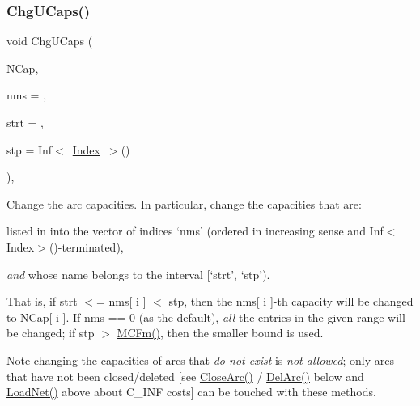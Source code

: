 \subsubsection{\texorpdfstring{Chg\+U\+Caps()}{ChgUCaps()}}
{\footnotesize\ttfamily void Chg\+U\+Caps (\begin{DoxyParamCaption}\item[{\mbox{\hyperlink{class_m_c_f_class_ad325f3193dbba0ddef1da4e72d29eda6}{c\+F\+Row}}}]{N\+Cap,  }\item[{\mbox{\hyperlink{class_m_c_f_class_a81575b2d4e4d5636b17170432150ae69}{c\+Index\+\_\+\+Set}}}]{nms = {},  }\item[{\mbox{\hyperlink{class_m_c_f_class_a76aaabb20535c51a2752b93f6c38fe54}{c\+Index}}}]{strt = {},  }\item[{\mbox{\hyperlink{class_m_c_f_class_ad53d6229d7ec28555a9c9c2fd9abf773}{Index}}}]{stp = {\ttfamily Inf$<$~\mbox{\hyperlink{class_m_c_f_class_ad53d6229d7ec28555a9c9c2fd9abf773}{Index}}~$>$()} }\end{DoxyParamCaption})\hspace{0.3cm}{\ttfamily [override]}, {\ttfamily [virtual]}}

Change the arc capacities. In particular, change the capacities that are\+:


\begin{DoxyItemize}
\item listed in into the vector of indices `nms' (ordered in increasing sense and Inf$<$\+Index$>$()-\/terminated),
\item {\itshape and} whose name belongs to the interval \mbox{[}`strt', `stp').
\end{DoxyItemize}

That is, if strt $<$= nms\mbox{[} i \mbox{]} $<$ stp, then the nms\mbox{[} i \mbox{]}-\/th capacity will be changed to N\+Cap\mbox{[} i \mbox{]}. If nms == 0 (as the default), {\itshape all} the entries in the given range will be changed; if stp $>$ \mbox{\hyperlink{class_m_c_f_class_ab4d5a0d0fc49882de0b4eb3146f1b7a6}{M\+C\+Fm()}}, then the smaller bound is used.

\begin{DoxyNote}{Note}
changing the capacities of arcs that {\itshape do not exist} is {\itshape not allowed}; only arcs that have not been closed/deleted \mbox{[}see \mbox{\hyperlink{class_s_p_tree_a4a964ce79159307998f5acd0018d01b1}{Close\+Arc()}} / \mbox{\hyperlink{class_s_p_tree_a3b6145c95b83f40a76d724eb2b92f80f}{Del\+Arc()}} below and \mbox{\hyperlink{class_s_p_tree_afbfa5c036f9ea67e35005ec77b82214a}{Load\+Net()}} above about C\+\_\+\+I\+NF costs\mbox{]} can be touched with these methods. 
\end{DoxyNote}


